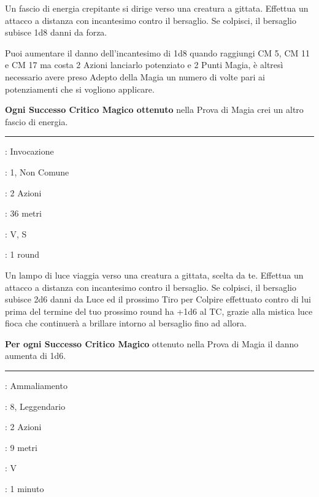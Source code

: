 \begin{multicols}{2}
Un fascio di energia crepitante si dirige verso una creatura a gittata. Effettua un attacco a distanza con incantesimo contro il bersaglio. Se colpisci, il bersaglio subisce 1d8 danni da forza.

Puoi aumentare il danno dell'incantesimo di 1d8 quando raggiungi CM 5, CM 11 e CM 17 ma costa 2 Azioni lanciarlo potenziato e 2 Punti Magia, è altresì necessario avere preso Adepto della Magia un numero di volte pari ai potenziamenti che si vogliono applicare.

\textbf{Ogni Successo Critico Magico ottenuto} nella Prova di Magia crei un altro fascio di energia.

\smallskip\noindent\rule{\linewidth}{2pt} \hypertarget{Dardo Tracciante}{}\smallskip{}
\noindent
\begin{description}[noitemsep, topsep=0pt, parsep=0pt, partopsep=0pt, leftmargin=0cm, labelwidth=2.8cm]
	\item[\textbf{Lista di Magia}]: Invocazione
	\item[\textbf{Livello}]: 1, Non Comune
	\item[\textbf{T. di Lancio}]: 2 Azioni
	\item[\textbf{Gittata}]: 36 metri
	\item[\textbf{Componenti}]: V, S
	\item[\textbf{Durata}]: 1 round
\end{description}

Un lampo di luce viaggia verso una creatura a gittata, scelta da te. Effettua un attacco a distanza con incantesimo contro il bersaglio. Se colpisci, il bersaglio subisce 2d6 danni da Luce ed il prossimo Tiro per Colpire effettuato contro di lui prima del termine del tuo prossimo round ha +1d6 al TC, grazie alla mistica luce fioca che continuerà a brillare intorno al bersaglio fino ad allora.

\textbf{Per ogni Successo Critico Magico} ottenuto nella Prova di Magia il danno aumenta di 1d6.

\smallskip\noindent\rule{\linewidth}{2pt} \hypertarget{Danza Irresistibile}{}\smallskip{}
\noindent
\begin{description}[noitemsep, topsep=0pt, parsep=0pt, partopsep=0pt, leftmargin=0cm, labelwidth=2.8cm]
	\item[\textbf{Lista di Magia}]: Ammaliamento
	\item[\textbf{Livello}]: 8, Leggendario
	\item[\textbf{T. di Lancio}]: 2 Azioni
	\item[\textbf{Gittata}]: 9 metri
	\item[\textbf{Componenti}]: V
	\item[\textbf{Durata}]: 1 minuto
\end{description}


\end{multicols}
